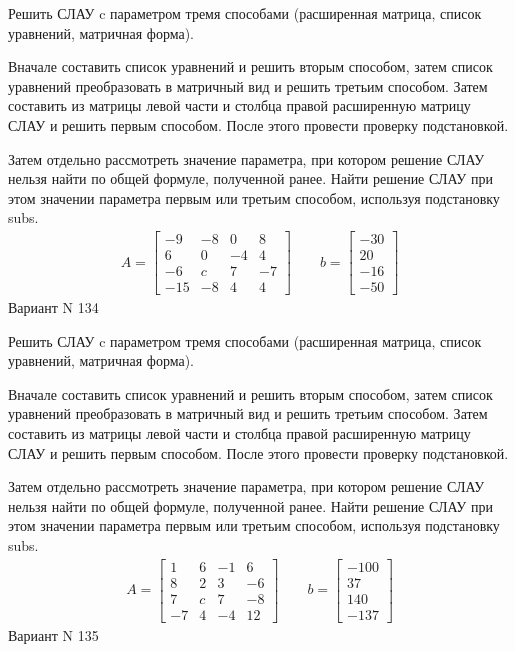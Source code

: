 \documentclass[11pt]{report}
\begin{document}
Решить СЛАУ c параметром тремя способами (расширенная матрица, список уравнений, матричная форма).

Вначале составить список уравнений и решить вторым способом,
затем список уравнений преобразовать в матричный вид и решить третьим способом.
Затем составить из матрицы левой части и столбца правой расширенную матрицу СЛАУ и решить первым способом.
После этого провести проверку подстановкой.

Затем отдельно рассмотреть значение параметра, при котором решение СЛАУ нельзя найти по общей формуле,
полученной ранее.
Найти решение СЛАУ при этом значении параметра первым или третьим способом, используя подстановку subs.
\begin{align*}
    A = \left[\begin{matrix}-9 & -8 & 0 & 8\\6 & 0 & -4 & 4\\-6 & c & 7 & -7\\-15 & -8 & 4 & 4\end{matrix}\right]
\qquad b = \left[\begin{matrix}-30\\20\\-16\\-50\end{matrix}\right]
\end{align*}
\newpage
Вариант N 134


Решить СЛАУ c параметром тремя способами (расширенная матрица, список уравнений, матричная форма).

Вначале составить список уравнений и решить вторым способом,
затем список уравнений преобразовать в матричный вид и решить третьим способом.
Затем составить из матрицы левой части и столбца правой расширенную матрицу СЛАУ и решить первым способом.
После этого провести проверку подстановкой.

Затем отдельно рассмотреть значение параметра, при котором решение СЛАУ нельзя найти по общей формуле,
полученной ранее.
Найти решение СЛАУ при этом значении параметра первым или третьим способом, используя подстановку subs.
\begin{align*}
    A = \left[\begin{matrix}1 & 6 & -1 & 6\\8 & 2 & 3 & -6\\7 & c & 7 & -8\\-7 & 4 & -4 & 12\end{matrix}\right]
\qquad b = \left[\begin{matrix}-100\\37\\140\\-137\end{matrix}\right]
\end{align*}
\newpage
Вариант N 135
\end{document}
